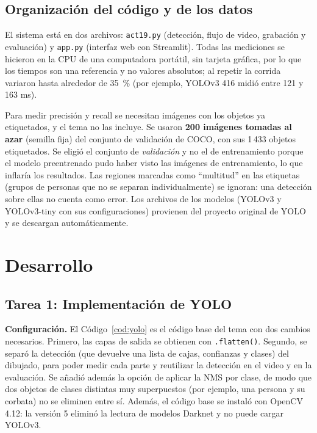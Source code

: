 \documentclass[11pt,letterpaper]{article}
\begin{document}
\subsection*{Organización del código y de los datos}

El sistema está en dos archivos: \texttt{act19.py} (detección, flujo de video, grabación y evaluación) y \texttt{app.py} (interfaz web con Streamlit). Todas las mediciones se hicieron en la CPU de una computadora portátil, sin tarjeta gráfica, por lo que los tiempos son una referencia y no valores absolutos; al repetir la corrida variaron hasta alrededor de 35~\% (por ejemplo, YOLOv3 416 midió entre 121 y 163 ms).

Para medir precisión y recall se necesitan imágenes con los objetos ya etiquetados, y el tema no las incluye. Se usaron \textbf{200 imágenes tomadas al azar} (semilla fija) del conjunto de validación de COCO, con sus 1\,433 objetos etiquetados. Se eligió el conjunto de \textit{validación} y no el de entrenamiento porque el modelo preentrenado pudo haber visto las imágenes de entrenamiento, lo que inflaría los resultados. Las regiones marcadas como ``multitud'' en las etiquetas (grupos de personas que no se separan individualmente) se ignoran: una detección sobre ellas no cuenta como error. Los archivos de los modelos (YOLOv3 y YOLOv3-tiny con sus configuraciones) provienen del proyecto original de YOLO y se descargan automáticamente.

\newpage

\section{Desarrollo}

\subsection{Tarea 1: Implementación de YOLO}

\textbf{Configuración.} El Código~\ref{cod:yolo} es el código base del tema con dos cambios necesarios. Primero, las capas de salida se obtienen con \texttt{.flatten()}. Segundo, se separó la detección (que devuelve una lista de cajas, confianzas y clases) del dibujado, para poder medir cada parte y reutilizar la detección en el video y en la evaluación. Se añadió además la opción de aplicar la NMS por clase, de modo que dos objetos de clases distintas muy superpuestos (por ejemplo, una persona y su corbata) no se eliminen entre sí. Además, el código base se instaló con OpenCV 4.12: la versión 5 eliminó la lectura de modelos Darknet y no puede cargar YOLOv3.
\end{document}
